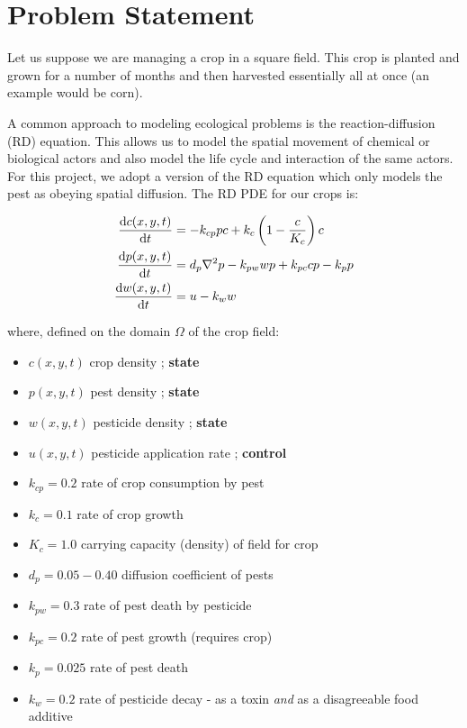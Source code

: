 \documentclass[11pt]{article}
\begin{document}
\section{Problem Statement}
Let us suppose we are managing a crop in a square field. This crop is planted and grown for a number of months and then harvested essentially all at once (an example would be corn).

A common approach to modeling ecological problems is the reaction-diffusion (RD) equation. This allows us to model the spatial movement of chemical or biological actors and also model the life cycle and interaction of the same actors. For this project, we adopt a version of the RD equation which only models the pest as obeying spatial diffusion. The RD PDE for our crops is:

\begin{align}
	\label{eqn:pde}
	\dv{c(x,y,t)}{t} &= -k_{cp} p c + k_c \left( 1 - \frac{c}{K_c} \right) c \nonumber \\ 
	\dv{p(x,y,t)}{t} &= d_p \laplacian{p} - k_{pw} w p + k_{pc} c p - k_p p \\
	\dv{w(x,y,t)}{t} &= u - k_w w \nonumber
\end{align}

where, defined on the domain $\Omega$ of the crop field:

\begin{itemize}
\setlength\itemsep{-1pt}
\item $c(x,y,t)$ crop density ; \textbf{state}
\item $p(x,y,t)$ pest density ; \textbf{state}
\item $w(x,y,t)$ pesticide density ; \textbf{state}
\item $u(x,y,t)$ pesticide application rate ; \textbf{control}
\item $k_{cp} = 0.2$ rate of crop consumption by pest
\item $k_c = 0.1$ rate of crop growth
\item $K_c = 1.0$ carrying capacity (density) of field for crop
\item $d_p = 0.05 - 0.40$ diffusion coefficient of pests
\item $k_{pw} = 0.3$ rate of pest death by pesticide
\item $k_{pc} = 0.2$ rate of pest growth (requires crop)
\item $k_p = 0.025$ rate of pest death
\item $k_w = 0.2$ rate of pesticide decay - as a toxin \textit{and} as a disagreeable food additive \cite{R4}
\end{itemize}
\end{document}
